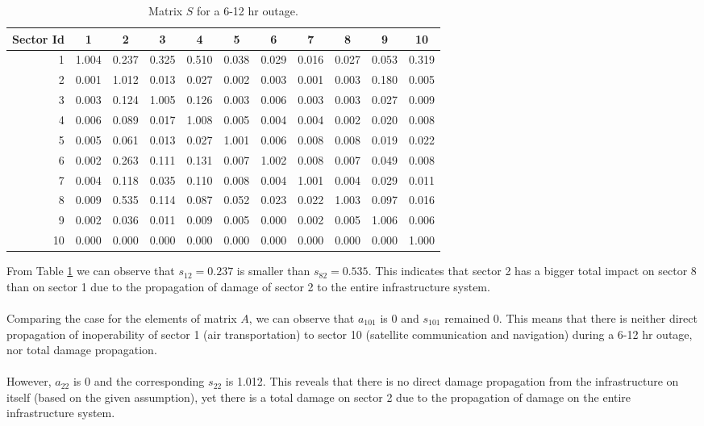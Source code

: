 \documentclass[11pt,a4paper]{article}
\begin{document}
\begin{table}[H]
  \centering
  \caption{Matrix $S$ for a 6-12 hr outage.}
    \begin{tabular}{r|rrrrrrrrrr}
    \toprule
    Sector Id & \multicolumn{1}{c}{1} & \multicolumn{1}{c}{2} & \multicolumn{1}{c}{3} & \multicolumn{1}{c}{4} & \multicolumn{1}{c}{5} & \multicolumn{1}{c}{6} & \multicolumn{1}{c}{7} & \multicolumn{1}{c}{8} & \multicolumn{1}{c}{9} & \multicolumn{1}{c}{10} \\
    \midrule
    1     & 1.004 & 0.237 & 0.325 & 0.510 & 0.038 & 0.029 & 0.016 & 0.027 & 0.053 & 0.319 \\
    2     & 0.001 & 1.012 & 0.013 & 0.027 & 0.002 & 0.003 & 0.001 & 0.003 & 0.180 & 0.005 \\
    3     & 0.003 & 0.124 & 1.005 & 0.126 & 0.003 & 0.006 & 0.003 & 0.003 & 0.027 & 0.009 \\
    4     & 0.006 & 0.089 & 0.017 & 1.008 & 0.005 & 0.004 & 0.004 & 0.002 & 0.020 & 0.008 \\
    5     & 0.005 & 0.061 & 0.013 & 0.027 & 1.001 & 0.006 & 0.008 & 0.008 & 0.019 & 0.022 \\
    6     & 0.002 & 0.263 & 0.111 & 0.131 & 0.007 & 1.002 & 0.008 & 0.007 & 0.049 & 0.008 \\
    7     & 0.004 & 0.118 & 0.035 & 0.110 & 0.008 & 0.004 & 1.001 & 0.004 & 0.029 & 0.011 \\
    8     & 0.009 & 0.535 & 0.114 & 0.087 & 0.052 & 0.023 & 0.022 & 1.003 & 0.097 & 0.016 \\
    9     & 0.002 & 0.036 & 0.011 & 0.009 & 0.005 & 0.000 & 0.002 & 0.005 & 1.006 & 0.006 \\
    10    & 0.000 & 0.000 & 0.000 & 0.000 & 0.000 & 0.000 & 0.000 & 0.000 & 0.000 & 1.000 \\
    \bottomrule
    \end{tabular}%
  \label{tab: Matrix S}%
\end{table}%
From Table \ref{tab: Matrix S} we can observe that $s_{12} = 0.237$ is smaller than $s_{82}=0.535$. This indicates that sector 2 has a bigger total impact on sector 8 than on sector 1 due to the propagation of damage of sector 2 to the entire infrastructure system. \\
\\
Comparing the case for the elements of matrix $A$, we can observe that $a_{101}$ is 0 and $s_{101}$ remained 0. This means that there is neither direct propagation of inoperability of sector 1 (air transportation) to sector 10 (satellite communication and navigation) during a 6-12 hr outage, nor total damage propagation. \\
\\
However, $a_{22}$ is 0 and the corresponding $s_{22}$ is 1.012. This reveals that there is no direct damage propagation from the infrastructure on itself (based on the given assumption), yet there is a total damage on sector 2 due to the propagation of damage on the entire infrastructure system. 
\end{document}

